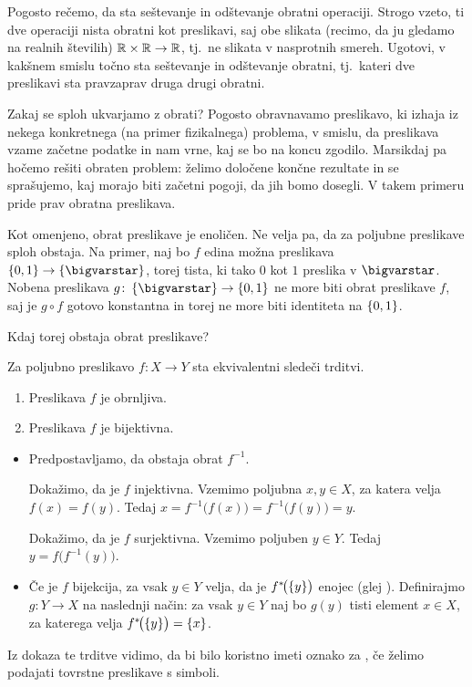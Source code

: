 		\begin{vaja}
			Pogosto rečemo, da sta seštevanje in odštevanje obratni operaciji. Strogo vzeto, ti dve operaciji nista obratni kot preslikavi, saj obe slikata (recimo, da ju gledamo na realnih številih) $\mathbb{R} \times \mathbb{R} \to \mathbb{R}$, tj.~ne slikata v nasprotnih smereh. Ugotovi, v kakšnem smislu točno sta seštevanje in odštevanje obratni, tj.~kateri dve preslikavi sta pravzaprav druga drugi obratni.
		\end{vaja}
		
		Zakaj se sploh ukvarjamo z obrati? Pogosto obravnavamo preslikavo, ki izhaja iz nekega konkretnega (na primer fizikalnega) problema, v smislu, da preslikava vzame začetne podatke in nam vrne, kaj se bo na koncu zgodilo. Marsikdaj pa hočemo rešiti obraten problem: želimo določene končne rezultate in se sprašujemo, kaj morajo biti začetni pogoji, da jih bomo dosegli. V takem primeru pride prav obratna preslikava.
		
		Kot omenjeno, obrat preslikave je enoličen. Ne velja pa, da za poljubne preslikave sploh obstaja. Na primer, naj bo $f$ edina možna preslikava $\set{0, 1} \to \set{\unit}$, torej tista, ki tako $0$ kot $1$ preslika v $\unit$. Nobena preslikava $g\colon \set{\unit} \to \set{0, 1}$ ne more biti obrat preslikave $f$, saj je $g \circ f$ gotovo konstantna in torej ne more biti identiteta na $\set{0, 1}$.
		
		Kdaj torej obstaja obrat preslikave?
		
		\begin{trditev}
			Za poljubno preslikavo $f\colon X \to Y$ sta ekvivalentni sledeči trditvi.
			\begin{enumerate}
				\item
					Preslikava $f$ je obrnljiva.
				\item
					Preslikava $f$ je bijektivna.
			\end{enumerate}
		\end{trditev}
		
		\begin{dokaz}
			\begin{itemize}
				\item{}
					Predpostavljamo, da obstaja obrat $f^{-1}$.
					
					Dokažimo, da je $f$ injektivna. Vzemimo poljubna $x, y \in X$, za katera velja $f(x) = f(y)$. Tedaj $x = f^{-1}\big(f(x)\big) = f^{-1}\big(f(y)\big) = y$.
					
					Dokažimo, da je $f$ surjektivna. Vzemimo poljuben $y \in Y$. Tedaj $y = f\big(f^{-1}(y)\big)$.
				\item{}
					Če je $f$ bijekcija, za vsak $y \in Y$ velja, da je $\pim[1]{f}{\set{y}}$ enojec (glej ). Definirajmo $g\colon Y \to X$ na naslednji način: za vsak $y \in Y$ naj bo $g(y)$ tisti element $x \in X$, za katerega velja $\pim[1]{f}{\set{y}} = \set{x}$. 
			\end{itemize}
		\end{dokaz}
		
		Iz dokaza te trditve vidimo, da bi bilo koristno imeti oznako za , če želimo podajati tovrstne preslikave s simboli.
		
